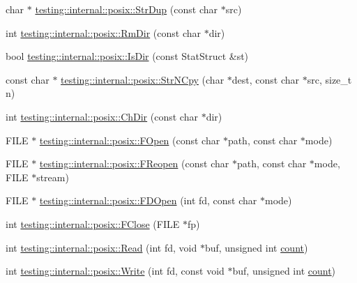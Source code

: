 \begin{DoxyCompactItemize}
\item 
char $\ast$ \mbox{\hyperlink{namespacetesting_1_1internal_1_1posix_a5c0864ea9d81d27332b9133e35cbc43c}{testing\+::internal\+::posix\+::\+Str\+Dup}} (const char $\ast$src)
\item 
int \mbox{\hyperlink{namespacetesting_1_1internal_1_1posix_acbad5d4ea5b73fd1765f5f760642932a}{testing\+::internal\+::posix\+::\+Rm\+Dir}} (const char $\ast$dir)
\item 
bool \mbox{\hyperlink{namespacetesting_1_1internal_1_1posix_af0d04ed5baeed28353fa38742748a421}{testing\+::internal\+::posix\+::\+Is\+Dir}} (const Stat\+Struct \&st)
\item 
const char $\ast$ \mbox{\hyperlink{namespacetesting_1_1internal_1_1posix_a3defc980438fce16cf5320a458ccea17}{testing\+::internal\+::posix\+::\+Str\+N\+Cpy}} (char $\ast$dest, const char $\ast$src, size\+\_\+t n)
\item 
int \mbox{\hyperlink{namespacetesting_1_1internal_1_1posix_a1ddc8a4fc6bb21da372307485591a212}{testing\+::internal\+::posix\+::\+Ch\+Dir}} (const char $\ast$dir)
\item 
F\+I\+LE $\ast$ \mbox{\hyperlink{namespacetesting_1_1internal_1_1posix_affa05d06d3e3b1ce975935cb0eac4fa7}{testing\+::internal\+::posix\+::\+F\+Open}} (const char $\ast$path, const char $\ast$mode)
\item 
F\+I\+LE $\ast$ \mbox{\hyperlink{namespacetesting_1_1internal_1_1posix_a7428e40e37fc1798e36804eafc11680b}{testing\+::internal\+::posix\+::\+F\+Reopen}} (const char $\ast$path, const char $\ast$mode, F\+I\+LE $\ast$stream)
\item 
F\+I\+LE $\ast$ \mbox{\hyperlink{namespacetesting_1_1internal_1_1posix_a78eb38374e5a5c87ab0cbb30583627f7}{testing\+::internal\+::posix\+::\+F\+D\+Open}} (int fd, const char $\ast$mode)
\item 
int \mbox{\hyperlink{namespacetesting_1_1internal_1_1posix_af4beeaaa8d62916d5e3b644a1ddfbd6b}{testing\+::internal\+::posix\+::\+F\+Close}} (F\+I\+LE $\ast$fp)
\item 
int \mbox{\hyperlink{namespacetesting_1_1internal_1_1posix_a3c6ab13e581a56f1b02f3eb7536c97fd}{testing\+::internal\+::posix\+::\+Read}} (int fd, void $\ast$buf, unsigned int \mbox{\hyperlink{_obj__test_2lib_2googletest-release-1_88_81_2googlemock_2test_2gmock__stress__test_8cc_afd9db40e3361ae09188795e8cbe19752}{count}})
\item 
int \mbox{\hyperlink{namespacetesting_1_1internal_1_1posix_af4acf9f78d55f815a18b43786511abef}{testing\+::internal\+::posix\+::\+Write}} (int fd, const void $\ast$buf, unsigned int \mbox{\hyperlink{_obj__test_2lib_2googletest-release-1_88_81_2googlemock_2test_2gmock__stress__test_8cc_afd9db40e3361ae09188795e8cbe19752}{count}})

\end{DoxyCompactItemize}
